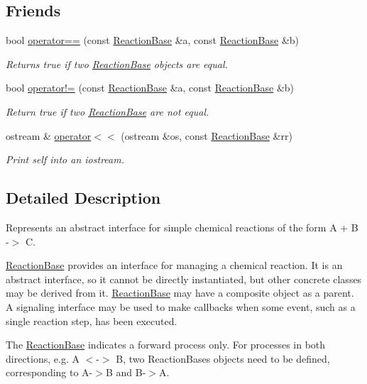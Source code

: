 \subsection*{Friends}
\begin{DoxyCompactItemize}
\item 
bool \hyperlink{classReactionBase_a0285e054f9aa3055e21cefe65c74fd80}{operator==} (const \hyperlink{classReactionBase}{Reaction\+Base} \&a, const \hyperlink{classReactionBase}{Reaction\+Base} \&b)
\begin{DoxyCompactList}\small\item\em Returns true if two \hyperlink{classReactionBase}{Reaction\+Base} objects are equal. \end{DoxyCompactList}\item 
bool \hyperlink{classReactionBase_a65d0e9651baf3f48044d585e619ccd6f}{operator!=} (const \hyperlink{classReactionBase}{Reaction\+Base} \&a, const \hyperlink{classReactionBase}{Reaction\+Base} \&b)
\begin{DoxyCompactList}\small\item\em Return true if two \hyperlink{classReactionBase}{Reaction\+Base} are not equal. \end{DoxyCompactList}\item 
ostream \& \hyperlink{classReactionBase_af19ff3a21157c2486e71d04ee0fa6567}{operator$<$$<$} (ostream \&os, const \hyperlink{classReactionBase}{Reaction\+Base} \&rr)
\begin{DoxyCompactList}\small\item\em Print self into an iostream. \end{DoxyCompactList}\end{DoxyCompactItemize}


\subsection{Detailed Description}
Represents an abstract interface for simple chemical reactions of the form A + B -\/$>$ C. 

\hyperlink{classReactionBase}{Reaction\+Base} provides an interface for managing a chemical reaction. It is an abstract interface, so it cannot be directly instantiated, but other concrete classes may be derived from it. \hyperlink{classReactionBase}{Reaction\+Base} may have a composite object as a parent. A signaling interface may be used to make callbacks when some event, such as a single reaction step, has been executed.

The \hyperlink{classReactionBase}{Reaction\+Base} indicates a forward process only. For processes in both directions, e.\+g. A $<$-\/$>$ B, two Reaction\+Bases objects need to be defined, corresponding to A-\/$>$B and B-\/$>$A.


